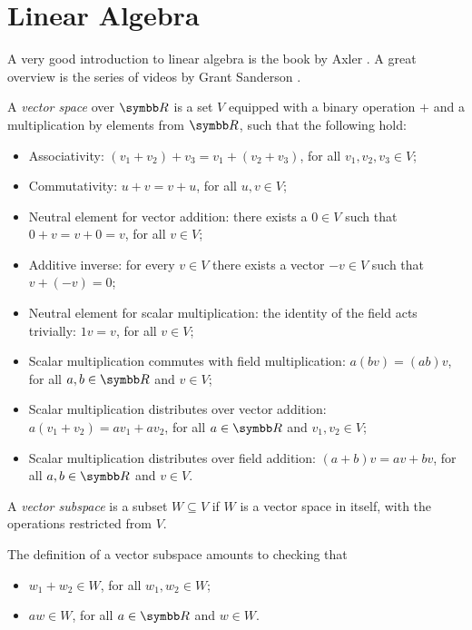 \chapter{Linear Algebra}

A very good introduction to linear algebra is the book by Axler \cite{Axler2014}. A great overview is the series of videos by Grant Sanderson \cite{3Blue1Brown_EssenceOfLinearAlgebra}.

\begin{definition}
A \emph{vector space} over \(\reals\) is a set \(V\) equipped with a binary operation \(+\) and a multiplication by elements from \(\reals\), such that the following hold:
\begin{itemize}
    \item Associativity: \(\left(v_1 + v_2\right) + v_3 = v_1 + \left(v_2 + v_3\right)\), for all \(v_1, v_2, v_3 \in V\);
    \item Commutativity: \(u + v = v + u\), for all \(u, v \in V\);
    \item Neutral element for vector addition: there exists a \(0 \in V\) such that \(0 + v = v + 0 = v\), for all \(v \in V\);
    \item Additive inverse: for every \(v \in V\) there exists a vector \(-v \in V\) such that \(v + (-v) = 0\);
    \item Neutral element for scalar multiplication: the identity of the field acts trivially: \(1 v = v\), for all \(v \in V\);
    \item Scalar multiplication commutes with field multiplication: \(a (bv) = (ab) v\), for all \(a, b \in \reals\) and \(v \in V\);
    \item Scalar multiplication distributes over vector addition: \(a \left(v_1 + v_2\right) = a v_1 + a v_2\), for all \(a \in \reals\) and \(v_1, v_2 \in V\);
    \item Scalar multiplication distributes over field addition: \((a + b) v = a v + b v\), for all \(a, b \in \reals\) and \(v \in V\).
\end{itemize}
\end{definition}

\begin{definition}
A \emph{vector subspace} is a subset \(W \subseteq V\) if \(W\) is a vector space in itself, with the operations restricted from \(V\).
\end{definition}

\begin{remark*}
The definition of a vector subspace amounts to checking that
\begin{itemize}
    \item \(w_1 + w_2 \in W\), for all \(w_1, w_2 \in W\);
    \item \(a w \in W\), for all \(a \in \reals\) and \(w \in W\).
\end{itemize}
\end{remark*}

